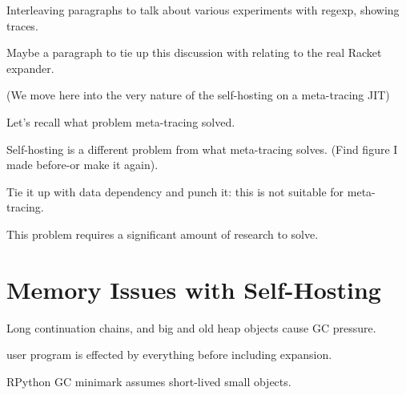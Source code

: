 			\begin{paragraph-here}
				Interleaving paragraphs to talk about various experiments with regexp, showing traces.
			\end{paragraph-here}

			\begin{paragraph-here}
				Maybe a paragraph to tie up this discussion with relating to the real Racket expander.
			\end{paragraph-here}

			(We move here into the very nature of the self-hosting on a meta-tracing JIT)

			\begin{paragraph-here}
				Let's recall what problem meta-tracing solved.
			\end{paragraph-here}

			\begin{paragraph-here}
				Self-hosting is a different problem from what meta-tracing solves. (Find figure I made before-or make it again).
			\end{paragraph-here}

			\begin{paragraph-here}
				Tie it up with data dependency and punch it: this is not suitable for meta-tracing.
			\end{paragraph-here}

			\begin{paragraph-here}
				This problem requires a significant amount of research to solve.
			\end{paragraph-here}


	\section{Memory Issues with Self-Hosting}
	\label{section:memory}

		\begin{mainpoint}
			Long continuation chains, and big and old heap objects cause GC pressure.
		\end{mainpoint}

		\begin{paragraph-here}
			user program is effected by everything before including expansion.
		\end{paragraph-here}

		\begin{paragraph-here}
			RPython GC minimark assumes short-lived small objects.
		\end{paragraph-here}

